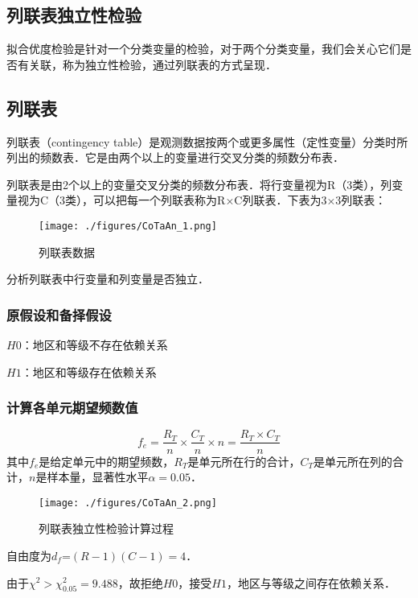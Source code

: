 \subsection{列联表独立性检验}
拟合优度检验是针对一个分类变量的检验，对于两个分类变量，我们会关心它们是否有关联，称为独立性检验，通过列联表的方式呈现．
\subsection{列联表}
列联表（contingency table）是观测数据按两个或更多属性（定性变量）分类时所列出的频数表．它是由两个以上的变量进行交叉分类的频数分布表．
\begin{example}{}
列联表是由2个以上的变量交叉分类的频数分布表．将行变量视为R（3类），列变量视为C（3类），可以把每一个列联表称为R×C列联表．下表为3×3列联表：
\begin{figure}[ht]
\centering
\texttt{[image: ./figures/CoTaAn\_1.png]}
\caption{列联表数据} \label{CoTaAn_fig1}
\end{figure}
分析列联表中行变量和列变量是否独立．

\subsubsection{原假设和备择假设}
$H0$：地区和等级不存在依赖关系

$H1$：地区和等级存在依赖关系
\subsubsection{计算各单元期望频数值}
\begin{equation}
f_e=\frac {R_T}{n}\times \frac {C_T}{n}\times n =\frac{R_T \times C_T}{n}
\end{equation}
其中$f_e$是给定单元中的期望频数，$R_T$是单元所在行的合计，$C_T$是单元所在列的合计，$n$是样本量，显著性水平$\alpha=0.05$．
\begin{figure}[ht]
\centering
\texttt{[image: ./figures/CoTaAn\_2.png]}
\caption{列联表独立性检验计算过程} \label{CoTaAn_fig2}
\end{figure}
自由度为$d_f$=$(R-1)(C-1)=4$．

由于$\chi^2>\chi^2_{0.05}=9.488$，故拒绝$H0$，接受$H1$，地区与等级之间存在依赖关系．
\end{example}